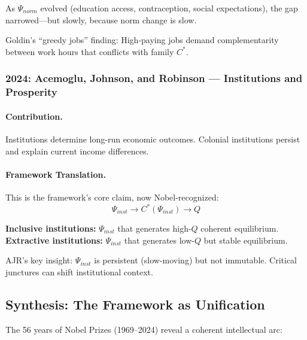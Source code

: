As $\Psi_{norm}$ evolved (education access, contraception, social expectations),
the gap narrowed---but slowly, because norm change is slow.

Goldin's ``greedy jobs'' finding: High-paying jobs demand complementarity
between work hours that conflicts with family $C^*$.

\subsubsection{2024: Acemoglu, Johnson, and Robinson --- Institutions and Prosperity}

\paragraph{Contribution.}
Institutions determine long-run economic outcomes. Colonial institutions
persist and explain current income differences.

\paragraph{Framework Translation.}
This is the framework's core claim, now Nobel-recognized:
\begin{equation}
  \Psi_{inst} \to C^*(\Psi_{inst}) \to Q
\end{equation}

\textbf{Inclusive institutions:} $\Psi_{inst}$ that generates high-$Q$ coherent equilibrium.
\textbf{Extractive institutions:} $\Psi_{inst}$ that generates low-$Q$ but stable equilibrium.

AJR's key insight: $\Psi_{inst}$ is persistent (slow-moving) but not immutable.
Critical junctures can shift institutional context.

\subsection{Synthesis: The Framework as Unification}

The 56 years of Nobel Prizes (1969--2024) reveal a coherent intellectual arc:

